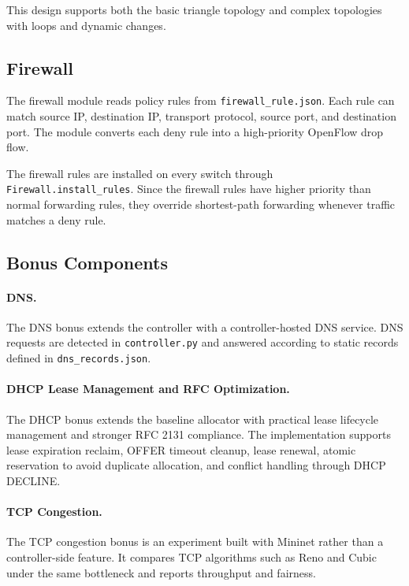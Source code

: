 \documentclass[11pt,a4paper]{article}
\begin{document}
This design supports both the basic triangle topology and complex topologies with loops
and dynamic changes.

\subsection{Firewall}

The firewall module reads policy rules from \texttt{firewall\_rule.json}. Each rule can
match source IP, destination IP, transport protocol, source port, and destination port.
The module converts each deny rule into a high-priority OpenFlow drop flow.

The firewall rules are installed on every switch through \texttt{Firewall.install\_rules}.
Since the firewall rules have higher priority than normal forwarding rules, they override
shortest-path forwarding whenever traffic matches a deny rule.

\subsection{Bonus Components}

\paragraph{DNS.}
The DNS bonus extends the controller with a controller-hosted DNS service. DNS requests
are detected in \texttt{controller.py} and answered according to static records defined in
\texttt{dns\_records.json}.

\paragraph{DHCP Lease Management and RFC Optimization.}
The DHCP bonus extends the baseline allocator with practical lease lifecycle management
and stronger RFC 2131 compliance. The implementation supports lease expiration reclaim,
OFFER timeout cleanup, lease renewal, atomic reservation to avoid duplicate allocation,
and conflict handling through DHCP DECLINE.

\paragraph{TCP Congestion.}
The TCP congestion bonus is an experiment built with Mininet rather than a controller-side
feature. It compares TCP algorithms such as Reno and Cubic under the same bottleneck and
reports throughput and fairness.
\end{document}
